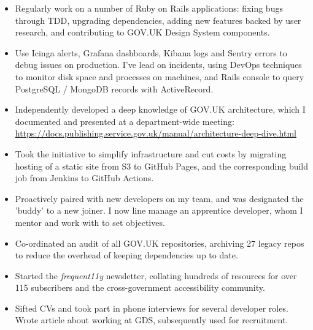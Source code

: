\documentclass[10pt,a4paper,ragged2e,withhyper]{altacv}
\begin{document}
\begin{paracol}{2}


\begin{itemize}
    \item Regularly work on a number of Ruby on Rails applications: fixing bugs through TDD, upgrading dependencies, adding new features backed by user research, and contributing to GOV.UK Design System components.
    \item Use Icinga alerts, Grafana dashboards, Kibana logs and Sentry errors to debug issues on production. I've lead on incidents, using DevOps techniques to monitor disk space and processes on machines, and Rails console to query PostgreSQL / MongoDB records with ActiveRecord.
    \item Independently developed a deep knowledge of GOV.UK architecture, which I documented and presented at a department-wide meeting:
    \\
    \href{https://docs.publishing.service.gov.uk/manual/architecture-deep-dive.html}{https://docs.publishing.service.gov.uk/manual/architecture-deep-dive.html}
    \item Took the initiative to simplify infrastructure and cut costs by migrating hosting of a static site from S3 to GitHub Pages, and the corresponding build job from Jenkins to GitHub Actions.
    \item Proactively paired with new developers on my team, and was designated the 'buddy' to a new joiner. I now line manage an apprentice developer, whom I mentor and work with to set objectives.
    \item Co-ordinated an audit of all GOV.UK repositories, archiving 27 legacy repos to reduce the overhead of keeping dependencies up to date.
    \item Started the \emph{frequent11y} newsletter, collating hundreds of resources for over 115 subscribers and the cross-government accessibility community.
    \item Sifted CVs and took part in phone interviews for several developer roles. Wrote article about working at GDS, subsequently used for recruitment.
\end{itemize}


\end{paracol}
\end{document}
